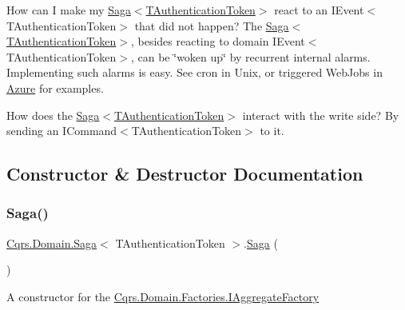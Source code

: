 How can I make my \hyperlink{classCqrs_1_1Domain_1_1Saga_a1b6019cecbbf2572b64dd456cb5d91a2_a1b6019cecbbf2572b64dd456cb5d91a2}{Saga$<$\+T\+Authentication\+Token$>$} react to an I\+Event$<$\+T\+Authentication\+Token$>$ that did not happen? The \hyperlink{classCqrs_1_1Domain_1_1Saga_a1b6019cecbbf2572b64dd456cb5d91a2_a1b6019cecbbf2572b64dd456cb5d91a2}{Saga$<$\+T\+Authentication\+Token$>$}, besides reacting to domain I\+Event$<$\+T\+Authentication\+Token$>$, can be \char`\"{}woken up\char`\"{} by recurrent internal alarms. Implementing such alarms is easy. See cron in Unix, or triggered Web\+Jobs in \hyperlink{namespaceCqrs_1_1Azure}{Azure} for examples.

How does the \hyperlink{classCqrs_1_1Domain_1_1Saga_a1b6019cecbbf2572b64dd456cb5d91a2_a1b6019cecbbf2572b64dd456cb5d91a2}{Saga$<$\+T\+Authentication\+Token$>$} interact with the write side? By sending an I\+Command$<$\+T\+Authentication\+Token$>$ to it. 

\subsection{Constructor \& Destructor Documentation}
\mbox{\label{classCqrs_1_1Domain_1_1Saga_a1b6019cecbbf2572b64dd456cb5d91a2_a1b6019cecbbf2572b64dd456cb5d91a2}} 
\subsubsection{\texorpdfstring{Saga()}{Saga()}\hspace{0.1cm}{\footnotesize\ttfamily [1/3]}}
{\footnotesize\ttfamily \hyperlink{classCqrs_1_1Domain_1_1Saga}{Cqrs.\+Domain.\+Saga}$<$ T\+Authentication\+Token $>$.\hyperlink{classCqrs_1_1Domain_1_1Saga}{Saga} (\begin{DoxyParamCaption}{ }\end{DoxyParamCaption})\hspace{0.3cm}{\ttfamily [protected]}}



A constructor for the \hyperlink{interfaceCqrs_1_1Domain_1_1Factories_1_1IAggregateFactory}{Cqrs.\+Domain.\+Factories.\+I\+Aggregate\+Factory} 

\mbox{\label{classCqrs_1_1Domain_1_1Saga_affa39972d1946ab9f5d2474b17acbdd4_affa39972d1946ab9f5d2474b17acbdd4}} 
